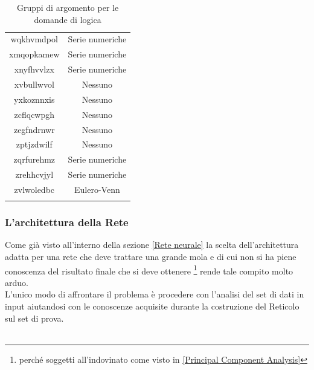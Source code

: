 \begin{longtable}{|c|c|}
wqkhvmdpol & Serie numeriche \\
xmqopkamew & Serie numeriche \\
xnyfhvvlzx & Serie numeriche \\
xvbullwvol & Nessuno \\
yxkoznnxis & Nessuno \\
zcflqcwpgh & Nessuno \\
zegfndrnwr & Nessuno \\
zptjzdwilf & Nessuno \\
zqrfurehmz & Serie numeriche \\
zrehhcvjyl & Serie numeriche \\
zvlwoledbc & Eulero-Venn \\
\hline
	
\caption{Gruppi di argomento per le domande di logica}\label{tab:Gruppi di argomento per le domande di logica}
\end{longtable}

\subsubsection{L'architettura della Rete}
\label{L'architettura della Rete}
Come già visto all'interno della sezione \ref{Rete neurale} la scelta dell'architettura adatta per una rete che deve trattare una grande mola e di cui non si ha piene conoscenza del risultato finale che si deve ottenere \footnote{perché soggetti all'indovinato come visto in \ref{Principal Component Analysis}} rende tale compito molto arduo.\\
L'unico modo di affrontare il problema è procedere con l'analisi del set di dati in input aiutandosi con le conoscenze acquisite durante la costruzione del Reticolo sul set di prova.\\\\

